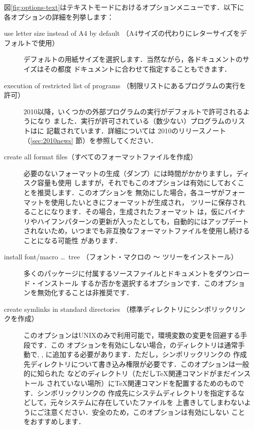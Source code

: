 \documentclass[uplatex,dvipdfmx,tombow]{jsarticle}
\begin{document}
図\ref{fig:options-text}はテキストモードにおけるオプションメニューです．以下に
各オプションの詳細を列挙します：
%
\begin{description}
\item[use letter size instead of A4 by default%
（A4サイズの代わりにレターサイズをデフォルトで使用）]
デフォルトの用紙サイズを選択します．当然ながら，各ドキュメントのサイズはその都度
ドキュメントに合わせて指定することもできます．

\item[execution of restricted list of programs%
（制限リストにあるプログラムの実行を許可）]
\TL{} 2010以降，いくつかの外部プログラムの実行がデフォルトで許可されるようになり
ました．実行が許可されている（数少ない）プログラムのリストはに
記載されています．詳細については\TL{} 2010のリリースノート（\ref{sec:2010news}%
節）を参照してください．

\item[create all format files（すべてのフォーマットファイルを作成）]
必要のないフォーマットの生成（ダンプ）には時間がかかりますし，ディスク容量も使用
しますが，それでもこのオプションは有効にしておくことを推奨します．このオプションを
無効にした場合，各ユーザがフォーマットを使用したいときにフォーマットが生成され，
ツリーに保存されることになります．その場合，生成されたフォーマット
は，仮にバイナリやハイフンパターンの更新が入ったとしても，自動的にはアップデート
されないため，いつまでも非互換なフォーマットファイルを使用し続けることになる可能性
があります．

\item[install font/macro \dots\ tree%
（フォント・マクロの 〜 ツリーをインストール）]
多くのパッケージに付属するソースファイルとドキュメントをダウンロード・インストール
するか否かを選択するオプションです．このオプションを無効化することは非推奨です．

\item[create symlinks in standard directories%
（標準ディレクトリにシンボリックリンクを作成）]
このオプションはUNIXのみで利用可能で，環境変数の変更を回避する手段です．この
オプションを有効にしない場合，\TL のディレクトリは通常手動で, , に追加する必要があります．ただし，シンボリックリンクの
作成先ディレクトリについて書き込み権限が必要です．このオプションは一般的に知られた
などのディレクトリ（ただし\TeX 関連コマンドがまだインストール
されていない場所）に\TeX 関連コマンドを配置するためのものです．シンボリックリンクの
作成先にシステムディレクトリを指定するなどして，元々システムに存在していたファイルを
上書きしてしまわないようにご注意ください．安全のため，このオプションは有効にしない
ことをおすすめします．


\end{description}
\end{document}
